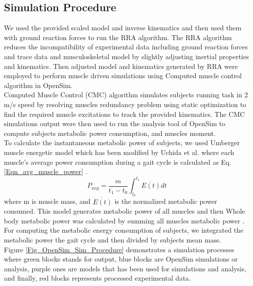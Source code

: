 \documentclass[10pt,letterpaper]{article}
\begin{document}
\subsection*{Simulation Procedure}
We used the provided scaled model and inverse kinematics and then used them with ground reaction forces to run the RRA algorithm\cite{103}. The RRA algorithm reduces the incompatibility of experimental data including ground reaction forces and trace data and musculoskeletal model by slightly adjusting inertial properties and kinematics. Then adjusted model and kinematics generated by RRA were employed to perform muscle driven simulations using Computed muscle control algorithm in OpenSim\cite{104}.\\
Computed Muscle Control (CMC) algorithm simulates subjects running task in 2 m/s speed by resolving muscles redundancy problem using static optimization to find the required muscle excitations to track the provided kinematics. The CMC simulations output were then used to run the analysis tool of OpenSim to compute subjects metabolic power consumption, and muscles moment.\\
To calculate the instantaneous metabolic power of subjects, we used Umberger \cite{105} muscle energetic model which has been modified by Uchida et al. \cite{106} where each muscle's average power consumption during a gait cycle is calculated as Eq.\ref{Eqn_avg_muscle_power} \cite{106}.
\begin{equation}\label{Eqn_avg_muscle_power}
	P_{avg} = \frac{m}{t_1 - t_0}\int_{t_0}^{t_1} \dot{E(t)} dt
\end{equation}
where m is muscle mass, and $\dot{E(t)}$ is the normalized metabolic power consumed. This model generates metabolic power of all muscles and then Whole body metabolic power was calculated by summing all muscles metabolic power \cite{106}. For computing the metabolic energy consumption of subjects, we integrated the metabolic power the gait cycle and then divided by subjects mean mass.\\
Figure \ref{Fig_OpenSim_Sim_Procedure} demonstrates a simulation processes where green blocks stands for output, blue blocks are OpenSim simulations or analysis, purple ones are models that has been used for simulations and analysis, and finally, red blocks represents processed experimental data.
\end{document}
